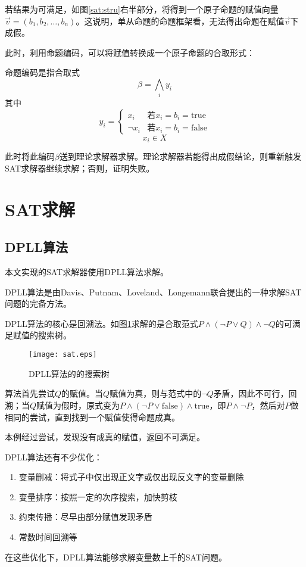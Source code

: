 若结果为可满足，如图\ref{sat:stru}右半部分，将得到一个原子命题的赋值向量$\vec{v}=(b_1, b_2, \dots , b_n)$。这说明，单从命题的命题框架看，无法得出命题在赋值$\vec{v}$下成假。

此时，利用命题编码，可以将赋值转换成一个原子命题的合取形式：
\begin{definition}[命题编码]命题编码是指合取式
  $$\beta = \bigwedge_i y_i$$
  其中
  \begin{equation*}
    y_i =
    \begin{cases}
      x_i & \text{若}x_i = b_i = \mathrm{true} \\
      \lnot x_i & \text{若}x_i = b_i = \mathrm{false}
    \end{cases}
  \end{equation*}
  $$ x_i \in X $$
\end{definition}


此时将此编码$\beta$送到理论求解器求解。理论求解器若能得出成假结论，则重新触发SAT求解器继续求解；否则，证明失败。

\section{SAT求解}
\subsection{DPLL算法}
本文实现的SAT求解器使用DPLL算法求解。

DPLL算法是由Davis、Putnam、Loveland、Longemann联合提出的一种求解SAT问题的完备方法。

DPLL算法的核心是回溯法。如图\ref{sat:dpll}求解的是合取范式$P \land (\lnot P \lor Q) \land \lnot Q$的可满足赋值的搜索树。

\begin{figure}[!htbp]
  \centering
  \texttt{[image: sat.eps]}
  \caption{DPLL算法的的搜索树}
  \label{sat:dpll}
\end{figure}

算法首先尝试$Q$的赋值。当$Q$赋值为真，则与范式中的$\lnot Q$矛盾，因此不可行，回溯；当$Q$赋值为假时，原式变为$P \land (\lnot P \lor \mathrm{false}) \land \mathrm{true}$，即$P \land \lnot P$，然后对$P$做相同的尝试，直到找到一个赋值使得命题成真。

本例经过尝试，发现没有成真的赋值，返回不可满足。

DPLL算法还有不少优化：
\begin{enumerate}
  \item 变量删减：将式子中仅出现正文字或仅出现反文字的变量删除
  \item 变量排序：按照一定的次序搜索，加快剪枝
  \item 约束传播：尽早由部分赋值发现矛盾
  \item 常数时间回溯等
\end{enumerate}
在这些优化下，DPLL算法能够求解变量数上千的SAT问题。

